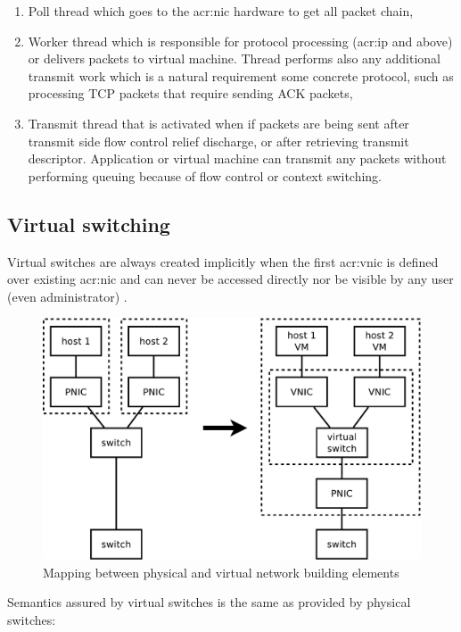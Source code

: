 \documentclass[11pt,openany]{book}
\begin{document}
        \begin{enumerate}
          \item Poll thread which goes to the \gls{acr:nic} hardware to get all packet chain,
          \item Worker thread which is responsible for protocol processing (\gls{acr:ip} and above) or delivers packets
                to virtual machine. Thread performs also any additional transmit work which is a natural requirement
                some concrete protocol, such as processing TCP packets that require sending ACK packets,
          \item Transmit thread that is activated when if packets are being sent after transmit side flow control relief
                discharge, or after retrieving transmit descriptor. Application or virtual machine can transmit any
                packets without performing queuing because of flow control or context switching.
        \end{enumerate}


      \subsection{Virtual switching}
        
        Virtual switches are always created implicitly when the first \gls{acr:vnic} is defined over existing
        \gls{acr:nic} and can never be accessed directly nor be visible by any user (even administrator)
        \cite{crossbow2}. 
        
        \begin{figure}[H]
          \centering
          \includegraphics[width=.7\textwidth]{img/solaris/mapping.pdf}

          \caption{Mapping between physical and virtual network building elements}
        \end{figure}
        
        Semantics assured by virtual switches is the same as provided by physical switches: 
\end{document}
